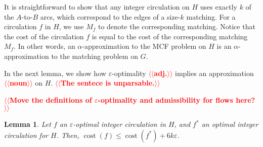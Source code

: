 \documentclass[11pt]{article}
\makeatletter
\def\eps{\varepsilon}
\theoremstyle{plain}
\newtheorem{lemma}{Lemma}[section]
\newtheorem{observation}[lemma]{Observation}
\numberwithin{figure}{section}
\def\cost{\operatorname{cost}}
\def\EMPH#1{\textbf{\boldmath #1}}
\def\n@te#1{\textsf{\boldmath \textbf{$\langle\!\langle$#1$\rangle\!\rangle$}}\leavevmode}
\def\note#1{\textcolor{red}{\n@te{#1}}}
\makeatother
\begin{document}
It is straightforward to show that any integer circulation on $H$ uses exactly
$k$ of the $A$-to-$B$ arcs, which correspond to the edges of a size-$k$
matching.
For a circulation $f$ in $H$, we use \EMPH{$M_f$} to denote the
corresponding matching.
Notice that the cost of the circulation $f$ is equal to the cost of the corresponding matching $M_f$.
%
%
In other words, an $\alpha$-approximation to the MCF
problem on $H$ is an $\alpha$-approximation to the matching problem on $G$.

In the next lemma, we show how $\eps$-optimality \note{adj.} implies an approximation \note{noun} on $H$. \note{The sentece is unparsable.}

\note{Move the definitions of $\eps$-optimality and admissibility for flows here?}

\begin{lemma}
\label{lemma:goldberg_cost_add}
Let $f$ an $\eps$-optimal integer circulation in $H$, and $f^*$ an optimal
integer circulation for $H$.
Then, $\cost(f) \leq \cost(f^*) + 6k\eps$.
\end{lemma}
\end{document}
